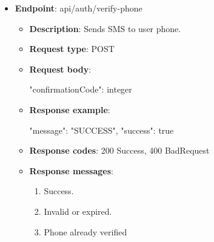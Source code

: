 \begin{itemize}
    \begin{itemize}
        \item \textbf{Description}: Performs login to the messenger.
        \item \textbf{Request type}: POST
        \item \textbf{Request body}:
        \begin{spverbatim}
        {
            "email": "string",
            "password": "string"
        }
        \end{spverbatim}
        \item \textbf{Response example}:
        \begin{spverbatim}
        {
            "accessToken": "string",
            "refreshTokenId": "string",
            "message": "SUCCESS",
            "success": true
        }
        \end{spverbatim}
        \item \textbf{Response codes}: 200 Success, 400 BadRequest
        \item \textbf{Response messages}:
        \begin{enumerate}
            \item Success.
            \item Invalid credentials.
        \end{enumerate}
    \end{itemize}

    \item \textbf{Endpoint}: api/auth/verify-phone
    \begin{itemize}
        \item \textbf{Description}: Sends SMS to user phone.
        \item \textbf{Request type}: POST
        \item \textbf{Request body}:
        \begin{spverbatim}
        {
            "confirmationCode": integer
        }
        \end{spverbatim}
        \item \textbf{Response example}:
        \begin{spverbatim}
        {
            "message": "SUCCESS",
            "success": true
        }
        \end{spverbatim}
        \item \textbf{Response codes}: 200 Success, 400 BadRequest
        \item \textbf{Response messages}:
        \begin{enumerate}
            \item Success.
            \item Invalid or expired.
            \item Phone already verified
        \end{enumerate}
    \end{itemize}


\end{itemize}
